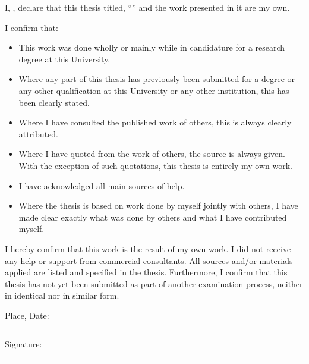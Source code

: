 \documentclass[
11pt, %
oneside, %
english, %
singlespacing, %
headsepline, %
chapterinoneline, %
]{MastersDoctoralThesis} %
\begin{document}
\renewcommand{\authorshipname}{
\begin{center}
Declaration of Authorship
\end{center}
}
\begin{declaration}

\noindent I, \authorname, declare that this thesis titled, \enquote{\ttitle} and the work presented in it are my own. 

I confirm that:


\begin{itemize}
\item This work was done wholly or mainly while in candidature for a research degree at this University.
\item Where any part of this thesis has previously been submitted for a degree or any other qualification at this University or any other institution, this has been clearly stated.
\item Where I have consulted the published work of others, this is always clearly attributed.
\item Where I have quoted from the work of others, the source is always given. With the exception of such quotations, this thesis is entirely my own work.
\item I have acknowledged all main sources of help.
\item Where the thesis is based on work done by myself jointly with others, I have made clear exactly what was done by others and what I have contributed myself.\\
\end{itemize}


\noindent I hereby confirm that this work is the result of my own work. I did not receive any
help or support from commercial consultants. All sources and/or materials applied
are listed and specified in the thesis. Furthermore, I confirm that this thesis has not
yet been submitted as part of another examination process, neither in identical nor
in similar form.


\vspace{3mm}

\noindent Place, Date:\\
\rule[0.5em]{15em}{0.5pt} %

\noindent Signature:\hspace{30mm}\\
\rule[0.5em]{15em}{0.5pt} %



\end{declaration}
\end{document}
